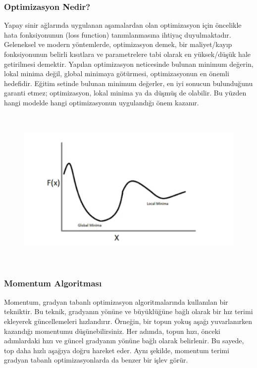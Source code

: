 \documentclass[12pt]{article}
\begin{document}
\subsubsection{Optimizasyon Nedir?}
Yapay sinir ağlarında uygulanan aşamalardan olan optimizasyon için öncelikle hata fonksiyonunun (loss function) tanımlanmasına ihtiyaç duyulmaktadır. Geleneksel ve modern yöntemlerde, optimizasyon demek, bir maliyet/kayıp fonksiyonunun belirli kısıtlara ve parametrelere tabi olarak en yüksek/düşük hale getirilmesi demektir. Yapılan optimizasyon neticesinde bulunan minimum değerin, lokal minima değil, global minimaya götürmesi, optimizasyonun en önemli hedefidir. Eğitim setinde bulunan minimum değerler, en iyi sonucun bulunduğunu garanti etmez; optimizasyon, lokal minima ya da düşmüş de olabilir. Bu yüzden hangi modelde hangi optimizasyonun uygulandığı önem kazanır.\cite{Seyyarer2020}
\begin{figure}[h]
    \centering
    \includegraphics[width=8\textwidth, height=8cm, keepaspectratio]{opt1.png}
    \label{fig:enter-label}
\end{figure}
\subsubsection{Momentum Algoritması}
Momentum, gradyan tabanlı optimizasyon algoritmalarında kullanılan bir tekniktir. Bu teknik, gradyanın yönüne ve büyüklüğüne bağlı olarak bir hız terimi ekleyerek güncellemeleri hızlandırır. Örneğin, bir topun yokuş aşağı yuvarlanırken kazandığı momentumu düşünebilirsiniz. Her adımda, topun hızı, önceki adımlardaki hızı ve güncel gradyanın yönüne bağlı olarak belirlenir. Bu sayede, top daha hızlı aşağıya doğru hareket eder. Aynı şekilde, momentum terimi gradyan tabanlı optimizasyonlarda da benzer bir işlev görür.
\end{document}
